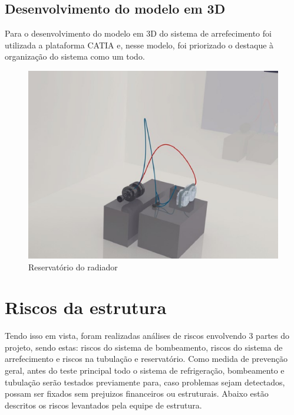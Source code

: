 \subsection{Desenvolvimento do modelo em 3D}

Para o desenvolvimento do modelo em 3D do sistema de arrefecimento foi utilizada a plataforma CATIA e, nesse modelo, foi priorizado o destaque à organização do sistema como um todo.

\begin{figure}[!htb]                                                               
   \centering                                                                      
   \includegraphics[scale=0.6, keepaspectratio=true]{figuras/visualizacao3d.eps} 
   \caption{Reservatório do radiador}
\end{figure}

\section{Riscos da estrutura}

Tendo  isso em vista, foram realizadas análises de riscos envolvendo 3 partes do projeto, sendo estas: riscos do sistema de bombeamento, riscos do sistema de arrefecimento e riscos na tubulação e reservatório.
Como medida de prevenção geral, antes do teste principal todo o sistema de refrigeração, bombeamento e tubulação serão testados previamente para, caso problemas sejam detectados, possam ser fixados sem prejuizos financeiros ou estruturais. Abaixo estão descritos os riscos levantados pela equipe de estrutura.


